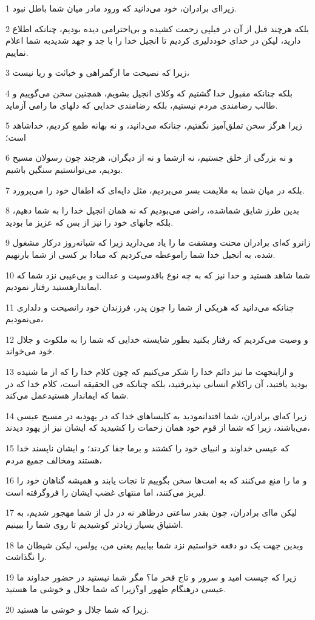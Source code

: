 \par 1 زیرا‌ای برادران، خود می‌دانید که ورود مادر میان شما باطل نبود.
\par 2 بلکه هرچند قبل از آن در فیلپی زحمت کشیده و بی‌احترامی دیده بودیم، چنانکه اطلاع دارید، لیکن در خدای خوددلیری کردیم تا انجیل خدا را با جد و جهد شدیدبه شما اعلام نماییم.
\par 3 زیرا که نصیحت ما ازگمراهی و خباثت و ریا نیست،
\par 4 بلکه چنانکه مقبول خدا گشتیم که وکلای انجیل بشویم، همچنین سخن می‌گوییم و طالب رضامندی مردم نیستیم، بلکه رضامندی خدایی که دلهای ما رامی آزماید.
\par 5 زیرا هرگز سخن تملق‌آمیز نگفتیم، چنانکه می‌دانید، و نه بهانه طمع کردیم، خداشاهد است؛
\par 6 و نه بزرگی از خلق جستیم، نه ازشما و نه از دیگران، هرچند چون رسولان مسیح بودیم، می‌توانستیم سنگین باشیم.
\par 7 بلکه در میان شما به ملایمت بسر می‌بردیم، مثل دایه‌ای که اطفال خود را می‌پرورد.
\par 8 بدین طرز شایق شماشده، راضی می‌بودیم که نه همان انجیل خدا را به شما دهیم، بلکه جانهای خود را نیز از بس که عزیز ما بودید.
\par 9 زانرو که‌ای برادران محنت ومشقت ما را یاد می‌دارید زیرا که شبانه‌روز درکار مشغول شده، به انجیل خدا شما راموعظه می‌کردیم که مبادا بر کسی از شما بارنهیم.
\par 10 شما شاهد هستید و خدا نیز که به چه نوع باقدوسیت و عدالت و بی‌عیبی نزد شما که ایماندارهستید رفتار نمودیم.
\par 11 چنانکه می‌دانید که هریکی از شما را چون پدر، فرزندان خود رانصیحت و دلداری می‌نمودیم،
\par 12 و وصیت می‌کردیم که رفتار بکنید بطور شایسته خدایی که شما را به ملکوت و جلال خود می‌خواند.
\par 13 و ازاینجهت ما نیز دائم خدا را شکر می‌کنیم که چون کلام خدا را که از ما شنیده بودید یافتید، آن راکلام انسانی نپذیرفتید، بلکه چنانکه فی الحقیقه است، کلام خدا که در شما که ایماندار هستیدعمل می‌کند.
\par 14 زیرا که‌ای برادران، شما اقتدانمودید به کلیساهای خدا که در یهودیه در مسیح عیسی می‌باشند، زیرا که شما از قوم خود همان زحمات را کشیدید که ایشان نیز از یهود دیدند،
\par 15 که عیسی خداوند و انبیای خود را کشتند و برما جفا کردند؛ و ایشان ناپسند خدا هستند ومخالف جمیع مردم،
\par 16 و ما را منع می‌کنند که به امت‌ها سخن بگوییم تا نجات یابند و همیشه گناهان خود را لبریز می‌کنند، اما منتهای غضب ایشان را فروگرفته است.
\par 17 لیکن ما‌ای برادران، چون بقدر ساعتی درظاهر نه در دل از شما مهجور شدیم، به اشتیاق بسیار زیادتر کوشیدیم تا روی شما را ببینیم.
\par 18 وبدین جهت یک دو دفعه خواستیم نزد شما بیاییم یعنی من، پولس، لیکن شیطان ما را نگذاشت.
\par 19 زیرا که چیست امید و سرور و تاج فخر ما؟ مگر شما نیستید در حضور خداوند ما عیسی درهنگام ظهور او؟زیرا که شما جلال و خوشی ما هستید.
\par 20 زیرا که شما جلال و خوشی ما هستید.

